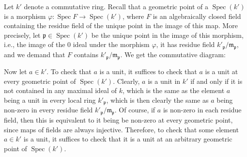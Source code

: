 \documentclass{article}
\theoremstyle{plain}
\theoremstyle{definition}
\DeclareMathOperator{\Spec}{Spec}
\newcommand{\mf}{\mathfrak}
\begin{document}
Let $k'$ denote a commutative ring. Recall that a geometric point of a $\Spec(k')$ is a morphism $\varphi \colon \Spec F\to \Spec(k')$, where $F$ is an algebraically closed field containing the residue field of the unique point in the image of this map. More precisely, let $\mf{p}\in \Spec(k')$ be the unique point in the image of this morphism, i.e., the image of the $0$ ideal under the morphism $\varphi$, it has residue field $k'_\mf{p}/\mf{m}_\mf{p}$, and we demand that $F$ contains $k'_\mf{p}/\mf{m}_\mf{p}$. We get the commutative diagram: 
\begin{center}
\end{center}


Now let $a\in k'$. To check that $a$ is a unit, it suffices to check that $a$ is a unit at every geometric point of $\Spec(k')$. Clearly, $a$ is a unit in $k'$ if and only if it is not contained in any maximal ideal of $k$, which is the same as the element $a$ being a unit in every local ring $k'_\mf{p}$, which is then clearly the same as $a$ being non-zero in every residue field $k'_\mf{p}/\mf{m}_\mf{p}$. Of course, if $a$ is non-zero in each residue field, then this is equivalent to it being be non-zero at every geometric point, since maps of fields are always injective. Therefore, to check that some element $a\in k'$ is a unit, it suffices to check that it is a unit at an arbitrary geometric point of $\Spec(k')$.
\end{document}
